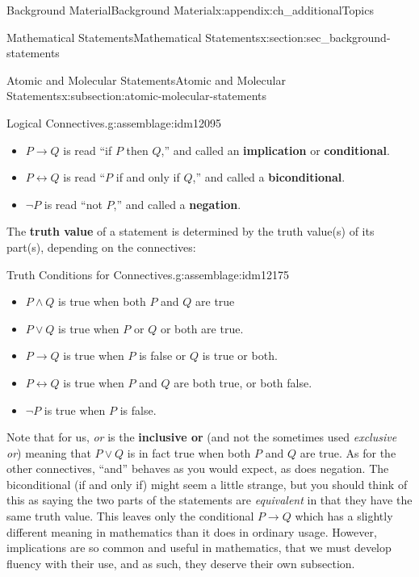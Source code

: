 \documentclass[oneside,10pt,]{book}
\newcommand{\terminology}[1]{\textbf{#1}}
\numberwithin{equation}{chapter}
\def\iff{\leftrightarrow}
\def\imp{\rightarrow}
\begin{document}
\begin{appendixptx}{Background Material}{}{Background Material}{}{}{x:appendix:ch_additionalTopics}
\begin{sectionptx}{Mathematical Statements}{}{Mathematical Statements}{}{}{x:section:sec_background-statements}
\begin{subsectionptx}{Atomic and Molecular Statements}{}{Atomic and Molecular Statements}{}{}{x:subsection:atomic-molecular-statements}
\begin{assemblage}{Logical Connectives.}{g:assemblage:idm12095}
\begin{itemize}[label=\textbullet]
\item{}\(P \imp Q\) is read ``if \(P\) then \(Q\),'' and called an \terminology{implication} or \terminology{conditional}.    %
\item{}\(P \iff Q\) is read ``\(P\) if and only if \(Q\),'' and called a \terminology{biconditional}.   %
\item{}\(\neg P\) is read ``not \(P\),'' and called a \terminology{negation}.  \label{g:notation:idm12170}%
\end{itemize}
%
\end{assemblage}
The \terminology{truth value} of a statement is determined by the truth value(s) of its part(s), depending on the connectives:%
\begin{assemblage}{Truth Conditions for Connectives.}{g:assemblage:idm12175}%
%
\begin{itemize}[label=\textbullet]
\item{}\(P \wedge Q\) is true when both \(P\) and \(Q\) are true%
\item{}\(P \vee Q\) is true when \(P\) or \(Q\) or both are true.%
\item{}\(P \imp Q\) is true when \(P\) is false or \(Q\) is true or both.%
\item{}\(P \iff Q\) is true when \(P\) and \(Q\) are both true, or both false.%
\item{}\(\neg P\) is true when \(P\) is false.%
\end{itemize}
%
\end{assemblage}
Note that for us, \emph{or} is the \terminology{inclusive or}  (and not the sometimes used \emph{exclusive or}) meaning that \(P \vee Q\) is in fact true when both \(P\) and \(Q\) are true. As for the other connectives, ``and'' behaves as you would expect, as does negation. The biconditional (if and only if) might seem a little strange, but you should think of this as saying the two parts of the statements are \emph{equivalent} in that they have the same truth value. This leaves only the conditional \(P \imp Q\) which has a slightly different meaning in mathematics than it does in ordinary usage. However, implications are so common and useful in mathematics, that we must develop fluency with their use, and as such, they deserve their own subsection.%
\end{subsectionptx}

\end{sectionptx}
\end{appendixptx}
\end{document}
